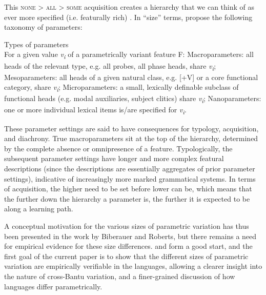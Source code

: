 \documentclass[output=paper]{langsci/langscibook}
\begin{document}
This \textsc{none > all > some} acquisition creates a hierarchy that we can think of as
ever more specified (i.e. featurally rich) . In “size” terms,
\textcite{BibRob2015,BibRob2016} propose the following taxonomy of parameters:

\ea\label{ex:vdwal:3.6} Types of parameters\\
    For a given value \emph{v\textsubscript{i}} of a parametrically variant
    feature F:
    \ea Macroparameters: all heads of the relevant type, e.g. all probes, all
    phase heads, share \emph{v\textsubscript{i}};
    \ex Mesoparameters: all heads of a given natural class, e.g. [+V] or a core
    functional category, share \emph{v\textsubscript{i}};
    \ex Microparameters: a small, lexically definable subclass of functional
    heads (e.g. modal auxiliaries, subject clitics) share
    \emph{v\textsubscript{i}};
    \ex Nanoparameters: one or more individual lexical items is/are specified
    for \emph{v\textsubscript{i}}.
    \z
\z

These parameter settings are said to have consequences for typology,
acquisition, and diachrony. True macroparameters sit at the top of the
hierarchy, determined by the complete absence or omnipresence of a feature.
Typologically, the subsequent parameter settings have longer and more complex
featural descriptions (since the descriptions are essentially aggregates of
prior parameter settings), indicative of increasingly more marked grammatical
systems. In terms of acquisition, the higher  need to be set before
lower  can be, which means that the further down the hierarchy a
parameter is, the further it is expected to be along a learning path.

A conceptual motivation for the various sizes of parametric variation has thus
been presented in the work by Biberauer and Roberts, but there remains a need
for empirical evidence for these size differences.
\textcite{BibRob2012,BibRob2016} and \citet{Ledgeway2013} form a good start,
and the first goal of the current paper is to show that the different sizes of
parametric variation are empirically verifiable in the  languages,
allowing a clearer insight into the nature of cross-Bantu variation, and a
finer-grained discussion of how languages differ parametrically.
\end{document}
